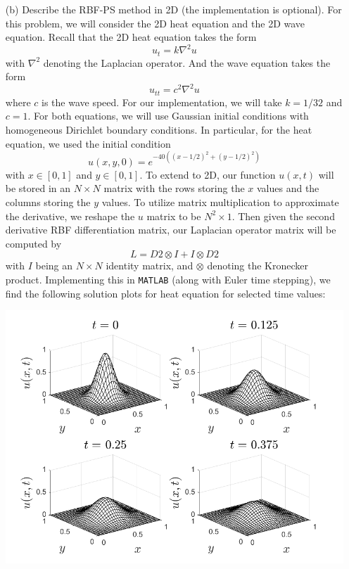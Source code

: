 \documentclass{article}
\begin{document}
\begin{itemize}
    \item[(b)] Describe the RBF-PS method in 2D (the implementation is optional).
    \newline\newline
    For this problem, we will consider the 2D heat equation and the 2D wave equation. Recall that the 2D heat equation takes the form
    \[u_t = k\nabla^2u\]
    with $\nabla^2$ denoting the Laplacian operator. And the wave equation takes the form
    \[u_{tt} = c^2\nabla^2u\]
    where $c$ is the wave speed. For our implementation, we will take $k = 1/32$ and $c = 1$. 
    For both equations, we will use Gaussian initial conditions with homogeneous Dirichlet boundary conditions. In particular, for the heat equation, we used the initial condition
    \[u(x,y,0) = e^{-40((x - 1/2)^2 + (y - 1/2)^2)}\]
    with $x \in [0, 1]$ and $y \in [0, 1]$.
    \newline
    To extend to 2D, our function $u(x,t)$ will be stored in an $N \times N$ matrix with the rows storing the $x$ values and the columns storing the $y$ values. To utilize matrix multiplication to approximate the derivative, we reshape the $u$ matrix to be $N^2 \times 1$. Then given the second derivative RBF differentiation matrix, our Laplacian operator matrix will be computed by
    \[L = D2 \otimes I + I \otimes D2\]
    with $I$ being an $N \times N$ identity matrix, and $\otimes$ denoting the Kronecker product. Implementing this in \verb+MATLAB+ (along with Euler time stepping), we find the following solution plots for heat equation for selected time values:
    \begin{center}
        \includegraphics[scale = 0.5]{2D_heateq_RBF.png}

\end{center}
\end{itemize}
\end{document}
